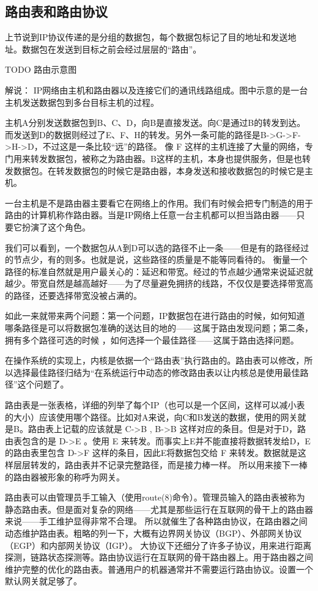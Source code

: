 \subsection{路由表和路由协议}

上节说到IP协议传递的是分组的数据包，每个数据包标记了目的地址和发送地址。数据包在发送到目标之前会经过层层的“路由”。

TODO 路由示意图

解说： IP网络由主机和路由器以及连接它们的通讯线路组成。图中示意的是一台主机发送数据包到多台目标主机的过程。

主机A分别发送数据包到B、C、D，向B是直接发送。向C是通过B的转发到达。而发送到D的数据则经过了E、F、H的转发。另外一条可能的路径是B->G->F->H->D，不过这是一条比较“远”的路径。
像 F 这样的主机连接了大量的网络，专门用来转发数据包，被称之为路由器。B这样的主机，本身也提供服务，但是也转发数据包。在转发数据包的时候它是路由器，本身发送和接收数据包的时候它是主机。

一台主机是不是路由器主要看它在网络上的作用。我们有时候会把专门制造的用于路由的计算机称作路由器。当是IP网络上任意一台主机都可以担当路由器——只要它扮演了这个角色。

我们可以看到，一个数据包从A到D可以选的路径不止一条——但是有的路径经过的节点少，有的则多。也就是说，这些路径的质量是不能等同看待的。
衡量一个路径的标准自然就是用户最关心的：延迟和带宽。经过的节点越少通常来说延迟就越少。带宽自然是越高越好——为了尽量避免拥挤的线路，不仅仅是要选择带宽高的路径，还要选择带宽没被占满的。

如此一来就带来两个问题：第一个问题，IP数据包在进行路由的时候，如何知道哪条路径是可以将数据包准确的送达目的地的——这属于路由发现问题；第二条，拥有多个路径可选的时候 ，如何选择一个最佳路径——这属于路由选择问题。

在操作系统的实现上，内核是依据一个“路由表”执行路由的。路由表可以修改，所以选择最佳路径归结为“在系统运行中动态的修改路由表以让内核总是使用最佳路径”这个问题了。

路由表是一张表格，详细的列举了每个IP（也可以是一个区间，这样可以减小表的大小）应该使用哪个路径。比如对A来说，向C和B发送的数据，使用的网关就是B。路由表上记载的应该就是 C->B , B->B 这样对应的条目。但是对于D，路由表包含的是 D->E 。使用 E 来转发。而事实上E并不能直接将数据转发给D，E 的路由表里包含 D->F 这样的条目，因此E将数据包交给 F 来转发。数据就是这样层层转发的，路由表并不记录完整路径，而是接力棒一样。
所以用来接下一棒的路由器被形象的称呼为网关。

路由表可以由管理员手工输入（使用route(8)命令）。管理员输入的路由表被称为静态路由表。但是面对复杂的网络——尤其是那些运行在互联网的骨干上的路由器来说——手工维护显得非常不合理。
所以就催生了各种路由协议，在路由器之间动态维护路由表。粗略的列一下，大概有边界网关协议（BGP）、外部网关协议（EGP）和内部网关协议（IGP）。
大协议下还细分了许多子协议，用来进行距离探测，链路状态探测等。路由协议运行在互联网的骨干路由器上。用于路由器之间维护完整的优化的路由表。普通用户的机器通常并不需要运行路由协议。设置一个默认网关就足够了。

